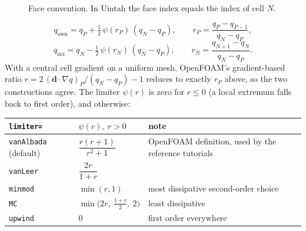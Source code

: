 \documentclass[11pt]{article}
\newcommand{\code}[1]{\texttt{\small #1}}
\newcommand{\own}{\mathrm{own}}
\newcommand{\nei}{\mathrm{nei}}
\begin{document}
\begin{figure}[ht]
\centering
{}
\caption{Face convention. In Uintah the face index equals the index of cell $N$.}
\end{figure}

\begin{equation}
  q_\own = q_P + \tfrac12\,\psi(r_P)\,(q_N-q_P),\qquad
  r_P = \frac{q_P-q_{P-1}}{q_N-q_P},
\end{equation}
\begin{equation}
  q_\nei = q_N - \tfrac12\,\psi(r_N)\,(q_N-q_P),\qquad
  r_N = \frac{q_{N+1}-q_N}{q_N-q_P}.
\end{equation}
With a central cell gradient on a uniform mesh, OpenFOAM's gradient-based ratio
$r = 2\,(\mathbf d\cdot\nabla q)_P/(q_N-q_P)-1$ reduces to exactly $r_P$ above, so the two
constructions agree. The limiter $\psi(r)$ is zero for $r\le 0$ (a local extremum falls back
to first order), and otherwise:

\begin{center}
\renewcommand{\arraystretch}{1.6}
\begin{tabular}{@{}l l l@{}}
\toprule
\code{limiter=} & $\psi(r),\ r>0$ & note \\
\midrule
\code{vanAlbada} (default) & $\dfrac{r(r+1)}{r^2+1}$ & OpenFOAM definition, used by the reference tutorials \\[1.5ex]
\code{vanLeer}  & $\dfrac{2r}{1+r}$ & \\[1.5ex]
\code{minmod}   & $\min(r,1)$ & most dissipative second-order choice \\
\code{MC}       & $\min\bigl(2r,\ \tfrac{1+r}{2},\ 2\bigr)$ & least dissipative \\
\code{upwind}   & $0$ & first order everywhere \\
\bottomrule
\end{tabular}
\end{center}
\end{document}

